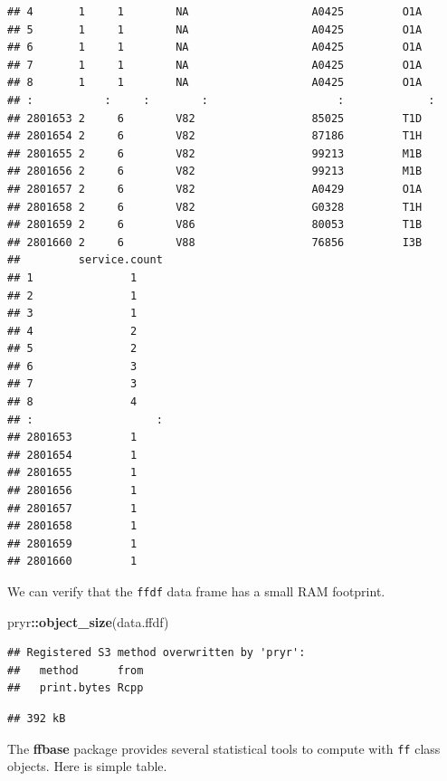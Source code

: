 \documentclass[]{book}
\newenvironment{Shaded}{\begin{snugshade}}{\end{snugshade}}
\newcommand{\KeywordTok}[1]{\textcolor[rgb]{0.13,0.29,0.53}{\textbf{#1}}}
\newcommand{\NormalTok}[1]{#1}
\newcommand{\OperatorTok}[1]{\textcolor[rgb]{0.81,0.36,0.00}{\textbf{#1}}}
\theoremstyle{definition}
\theoremstyle{definition}
\theoremstyle{definition}
\theoremstyle{remark}
\begin{document}
\begin{verbatim}
## 4       1     1        NA                   A0425         O1A  
## 5       1     1        NA                   A0425         O1A  
## 6       1     1        NA                   A0425         O1A  
## 7       1     1        NA                   A0425         O1A  
## 8       1     1        NA                   A0425         O1A  
## :           :     :        :                    :             :
## 2801653 2     6        V82                  85025         T1D  
## 2801654 2     6        V82                  87186         T1H  
## 2801655 2     6        V82                  99213         M1B  
## 2801656 2     6        V82                  99213         M1B  
## 2801657 2     6        V82                  A0429         O1A  
## 2801658 2     6        V82                  G0328         T1H  
## 2801659 2     6        V86                  80053         T1B  
## 2801660 2     6        V88                  76856         I3B  
##         service.count
## 1               1    
## 2               1    
## 3               1    
## 4               2    
## 5               2    
## 6               3    
## 7               3    
## 8               4    
## :                   :
## 2801653         1    
## 2801654         1    
## 2801655         1    
## 2801656         1    
## 2801657         1    
## 2801658         1    
## 2801659         1    
## 2801660         1
\end{verbatim}

We can verify that the \texttt{ffdf} data frame has a small RAM footprint.

\begin{Shaded}
\begin{Highlighting}[]
\NormalTok{pryr}\OperatorTok{::}\KeywordTok{object_size}\NormalTok{(data.ffdf)}
\end{Highlighting}
\end{Shaded}

\begin{verbatim}
## Registered S3 method overwritten by 'pryr':
##   method      from
##   print.bytes Rcpp
\end{verbatim}

\begin{verbatim}
## 392 kB
\end{verbatim}

The \textbf{ffbase} package provides several statistical tools to compute with \texttt{ff} class objects.
Here is simple table.

\begin{Shaded}
\end{Shaded}
\end{document}
